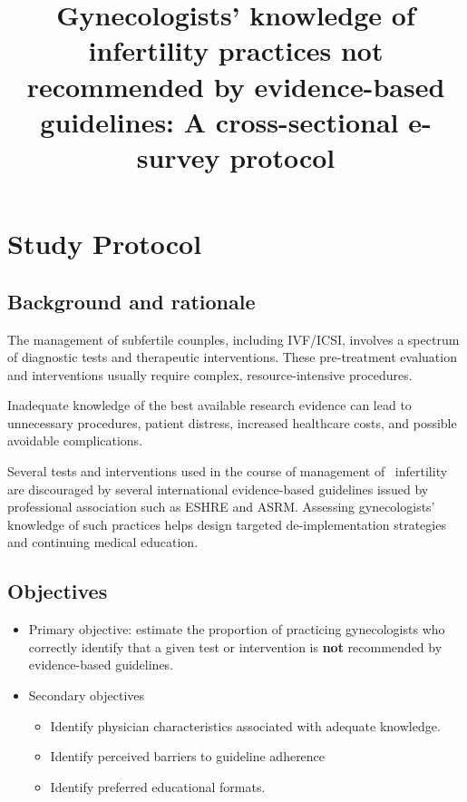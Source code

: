 \documentclass[
  letterpaper,
  DIV=11,
  numbers=noendperiod]{scrartcl}
\title{Gynecologists' knowledge of infertility practices not recommended
by evidence-based guidelines: A cross-sectional e-survey protocol}
\author{}
\date{}
\begin{document}
\maketitle


\section{Study Protocol}\label{study-protocol}

\subsection{Background and rationale}\label{background-and-rationale}

The management of subfertile counples, including IVF/ICSI, involves a
spectrum of diagnostic tests and therapeutic interventions. These
pre-treatment evaluation and interventions usually require complex,
resource-intensive procedures.

Inadequate knowledge of the best available research evidence can lead to
unnecessary procedures, patient distress, increased healthcare costs,
and possible avoidable complications.

Several tests and interventions used in the course of management of
~infertility are discouraged by several international evidence-based
guidelines issued by professional association such as ESHRE and ASRM.
Assessing gynecologists' knowledge of such practices helps design
targeted de-implementation strategies and continuing medical education.

\subsection{Objectives}\label{objectives}

\begin{itemize}
\item
  Primary objective: estimate the proportion of practicing gynecologists
  who correctly identify that a given test or intervention is
  \textbf{not} recommended by evidence-based guidelines.
\item
  Secondary objectives

  \begin{itemize}
  \item
    Identify physician characteristics associated with adequate
    knowledge.
  \item
    Identify perceived barriers to guideline adherence
  \item
    Identify preferred educational formats.
  \end{itemize}
\end{itemize}
\end{document}
